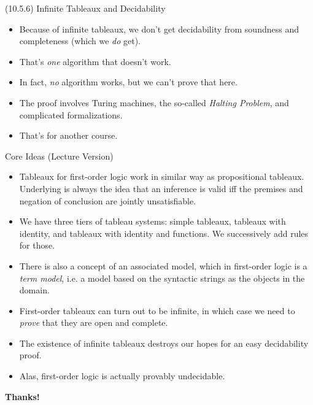 \documentclass[../slides.tex]{subfiles}
\begin{document}
\begin{frame}{(10.5.6) Infinite Tableaux and Decidability}

	\begin{itemize}

		\item Because of infinite tableaux, we don't get decidability from soundness and completeness (which we \emph{do} get).
		
		\item That's \emph{one} algorithm that doesn't work.
		
		\item In fact, \emph{no} algorithm works, but we can't prove that here.
		
		\item The proof involves Turing machines, the so-called \emph{Halting Problem}, and complicated formalizations.
		
		\item That's for another course.

	\end{itemize}

\end{frame}

\begin{frame}{Core Ideas (Lecture Version)}

\begin{itemize}
	
		\item Tableaux for first-order logic work in similar way as propositional tableaux. Underlying is always the idea that an inference is valid iff the premises and negation of conclusion are jointly unsatisfiable.				
		\item We have three tiers of tableau systems: simple tableaux, tableaux with identity, and tableaux with identity and functions. We successively add rules for those.
		
		\item There is also a concept of an associated model, which in first-order logic is a \emph{term model}, i.e. a model based on the syntactic strings as the objects in the domain.
		
		\item First-order tableaux can turn out to be infinite, in which case we need to \emph{prove} that they are open and complete.
		
		\item The existence of infinite tableaux destroys our hopes for an easy decidability proof.
		
		\item Alas, first-order logic is actually provably undecidable.
	
	\end{itemize}

\end{frame}

\begin{frame}

	\begin{center}
	{\huge\bf Thanks!}
	\end{center}

\end{frame}
\end{document}

